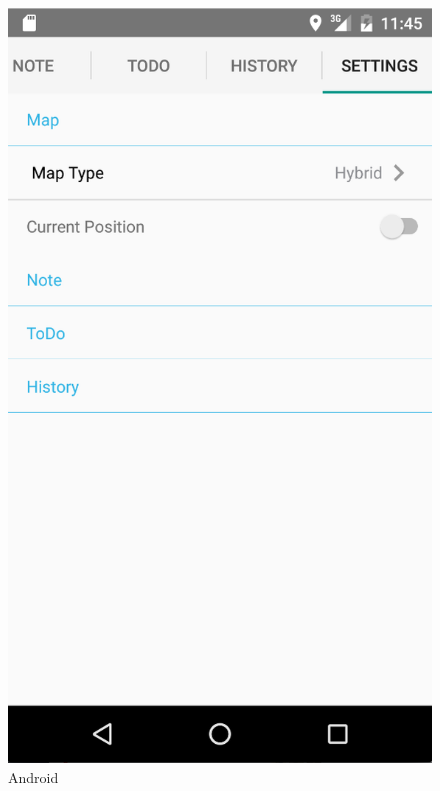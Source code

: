 \documentclass[12pt]{article}
\begin{document}
\begin{figure}[ht]
	\includegraphics[width=\linewidth, height=0.4\textheight, keepaspectratio=true, frame]{screenshots/SettingsAnd.png}
	\caption{Android}
	\endminipage\hfill
\end{figure}
\clearpage
\end{document}
